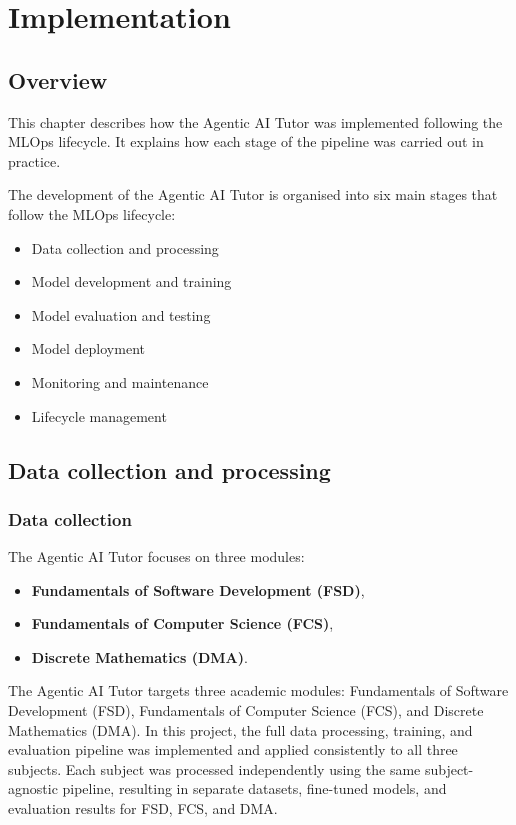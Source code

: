 \chapter{Implementation}
\label{chap:implementation}

\section{Overview}
This chapter describes how the Agentic AI Tutor was implemented following the MLOps lifecycle. It explains how each stage of the pipeline was carried out in practice.

The development of the Agentic AI Tutor is organised into six main stages that follow the MLOps lifecycle:
\begin{itemize}
    \item Data collection and processing
    \item Model development and training
    \item Model evaluation and testing
    \item Model deployment
    \item Monitoring and maintenance
    \item Lifecycle management
\end{itemize}

\section{Data collection and processing}
\subsection{Data collection}
The Agentic AI Tutor focuses on three modules:

\begin{itemize}
    \item \textbf{Fundamentals of Software Development (FSD)},
    \item \textbf{Fundamentals of Computer Science (FCS)},
    \item \textbf{Discrete Mathematics (DMA)}.
\end{itemize}

The Agentic AI Tutor targets three academic modules: Fundamentals of Software Development (FSD),
Fundamentals of Computer Science (FCS), and Discrete Mathematics (DMA). In this project, the full data processing, training, and evaluation pipeline was implemented and applied consistently to all three subjects. Each subject was processed independently using the same subject-agnostic pipeline, resulting in separate datasets, fine-tuned models, and evaluation results for FSD, FCS, and DMA.

